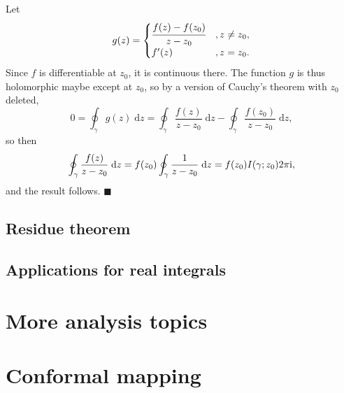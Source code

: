 \documentclass[letter-paper]{tufte-book}
\newenvironment{proof}[1][Proof]{\begin{trivlist}
\item[\hskip \labelsep {\bfseries #1}]}{\end{trivlist}}
\newcommand{\zi}{{\rm i}}
\newcommand{\qed}{\hfill$\blacksquare$}
\begin{document}
\begin{proof}
  Let
  \begin{equation*}
    g(z) = \begin{cases} \cfrac{f(z) - f(z_0)}{z - z_0}&, z \neq z_0,\\
      f'(z)&, z = z_0.\end{cases}
  \end{equation*}
  Since $f$ is differentiable at $z_0$, it is continuous there. The function $g$
  is thus holomorphic maybe except at $z_0$, so by a version of Cauchy's theorem
  with $z_0$ deleted,
  \begin{equation*}
    0 = \oint_\gamma g(z)\; \mathrm{d}z = \oint_\gamma \frac{f(z)}{z - z_0}\; \mathrm{d}z - \oint_\gamma \frac{f(z_0)}{z - z_0}\; \mathrm{d}z,
  \end{equation*}
  so then
  \begin{equation*}
    \oint_\gamma \frac{f(z)}{z - z_0}\; \mathrm{d}z = f(z_0) \oint_\gamma \frac{1}{z - z_0}\; \mathrm{d}z = f(z_0) I(\gamma; z_0) 2\pi\zi,
  \end{equation*}
  and the result follows. \qed
\end{proof}


\section{Residue theorem}


\section{Applications for real integrals}


\chapter{More analysis topics}


\chapter{Conformal mapping}
\end{document}
